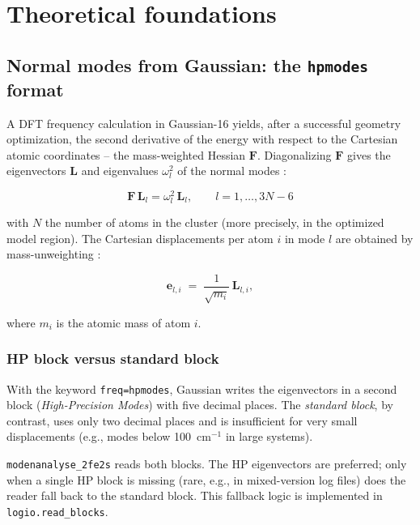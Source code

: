 \documentclass[11pt,a4paper,twoside]{article}
\newcommand{\evec}{\mathbf{e}}
\theoremstyle{remark}
\begin{document}
\section{Theoretical foundations}
\label{sec:theorie}

\subsection{Normal modes from Gaussian: the \texttt{hpmodes} format}
\label{sec:normalmoden}

A DFT frequency calculation in Gaussian-16 yields, after a successful
geometry optimization, the second derivative of the energy with respect
to the Cartesian atomic coordinates -- the mass-weighted Hessian
$\mathbf{F}$. Diagonalizing $\mathbf{F}$ gives the eigenvectors
$\mathbf{L}$ and eigenvalues $\omega_l^2$ of the normal modes
\cite{WilsonDeciusCross1955}:

\begin{equation}
  \mathbf{F}\,\mathbf{L}_l = \omega_l^2 \, \mathbf{L}_l ,
  \qquad l = 1, \ldots, 3N-6
  \label{eq:fg-eigenproblem}
\end{equation}

with $N$ the number of atoms in the cluster (more precisely, in the
optimized model region). The Cartesian displacements per atom $i$ in
mode $l$ are obtained by mass-unweighting
\cite{WilsonDeciusCross1955}:

\begin{equation}
  \evec_{l,i} \;=\; \frac{1}{\sqrt{m_i}}\,\mathbf{L}_{l,i} ,
  \label{eq:demass}
\end{equation}

where $m_i$ is the atomic mass of atom $i$.

\subsubsection*{HP block versus standard block}

With the keyword \texttt{freq=hpmodes}, Gaussian writes the
eigenvectors in a second block (\emph{High-Precision Modes}) with
five decimal places. The \emph{standard block}, by contrast, uses
only two decimal places and is insufficient for very small
displacements (e.g., modes below 100~cm$^{-1}$ in large systems).

\texttt{modenanalyse\_2fe2s} reads both blocks. The HP eigenvectors
are preferred; only when a single HP block is missing (rare, e.g.,
in mixed-version log files) does the reader fall back to the
standard block. This fallback logic is implemented in
\texttt{logio.read\_blocks}.
\end{document}

